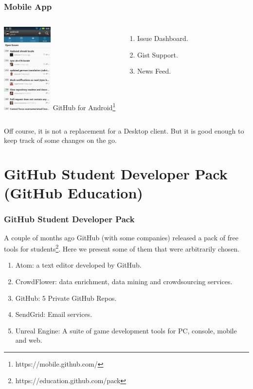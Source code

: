 \begin{frame}
    \frametitle{Mobile App}
\begin{columns}[c]
\column{2in}
	\centering
	\includegraphics[width=1in]{img/mobile.jpg} 
\column{2in}
GitHub for Android\footnote{https://mobile.github.com/}
\begin{enumerate}
\item Issue Dashboard.
\item Gist Support.
\item News Feed.
\end{enumerate}
\end{columns}
\vspace{5mm}
{\small Off course, it is not a replacement for a Desktop client. But it is good enough to keep track of some changes on the go.}
\end{frame}


\section[GitHub Education]{GitHub Student Developer Pack (GitHub Education)}

\begin{frame}
    \frametitle{GitHub Student Developer Pack}
      
    A couple of months ago GitHub (with some companies) released a pack of free tools for students\footnote{https://education.github.com/pack}. Here we present some of them that were arbitrarily chosen.
    
    \begin{enumerate}    
    \item Atom: a text editor developed by GitHub. \pause
    
    \item CrowdFlower: data enrichment, data mining and crowdsourcing services. \pause
    
    \item GitHub: 5 Private GitHub Repos. \pause
    
    \item SendGrid: Email services. \pause
    
    \item Unreal Engine: A suite of game development tools for PC, console, mobile and web.
    \end{enumerate}

\end{frame}
    

